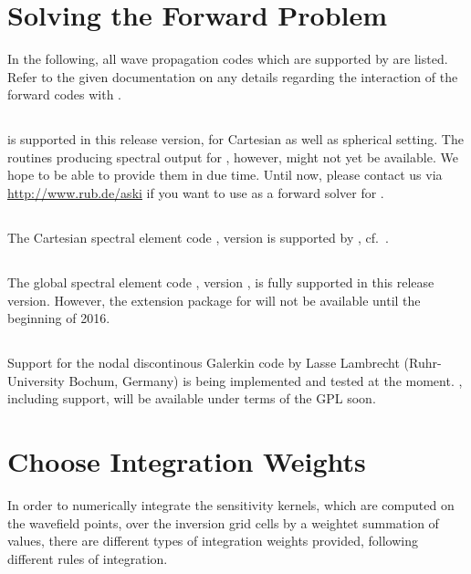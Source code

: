 \section{Solving the Forward Problem} \label{basic_steps,sec:forward_problem}
%
In the following, all wave propagation codes which are supported by \ASKI are listed.
Refer to the given documentation on any details regarding the interaction of the forward codes with \ASKI.
\subsection*{}
 is supported in this release version, for Cartesian as well as spherical setting. 
The  routines producing spectral output for \ASKI, however, might not yet be available. 
We hope to be able to provide them in due time. Until now, please contact us via \url{http://www.rub.de/aski}
if you want to use  as a forward solver for \ASKI.
\subsection*{}
The Cartesian spectral element code , version  is supported by \ASKI, 
cf.~\cite{Specfem3D_Cartesian_for_ASKI}.
\subsection*{}
The global spectral element code , version , is fully supported in 
this release version. However, the extension package for  will not be available 
until the beginning of 2016. 
\subsection*{}
Support for the nodal discontinous Galerkin code  by Lasse Lambrecht (Ruhr-University Bochum, Germany)
is being implemented and tested at the moment. , including \ASKI support, will be available 
under terms of the GPL soon.
%
\section{Choose Integration Weights} \label{basic_steps,sec:intw}
%
In order to numerically integrate the sensitivity kernels, which are computed on the wavefield points, 
over the inversion grid cells by a weightet summation of values, there are different 
types of integration weights provided, following different rules of integration.

